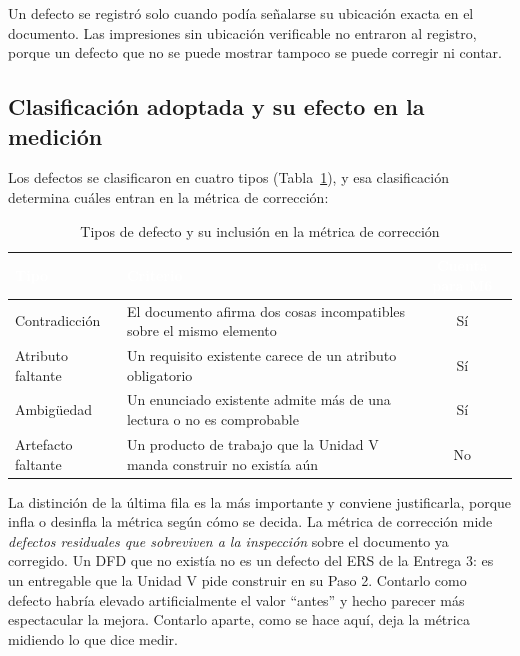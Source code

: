 Un defecto se registr\'o solo cuando pod\'ia se\~nalarse su ubicaci\'on exacta en el documento. Las impresiones sin ubicaci\'on verificable no entraron al registro, porque un defecto que no se puede mostrar tampoco se puede corregir ni contar.

\subsection{Clasificaci\'on adoptada y su efecto en la medici\'on}

Los defectos se clasificaron en cuatro tipos (Tabla~\ref{tab:tipos-defecto}), y esa clasificaci\'on determina cu\'ales entran en la m\'etrica de correcci\'on:

\begin{table}[H]
\centering
\small
\begin{tabular}{|l|p{7.6cm}|c|}
\hline
\cellcolor{sigagreen}\textcolor{white}{\textbf{Tipo}} & \cellcolor{sigagreen}\textcolor{white}{\textbf{Criterio}} & \cellcolor{sigagreen}\textcolor{white}{\textbf{Cuenta para M6}} \\ \hline
Contradicci\'on & El documento afirma dos cosas incompatibles sobre el mismo elemento & S\'i \\ \hline
Atributo faltante & Un requisito existente carece de un atributo obligatorio & S\'i \\ \hline
Ambig\"uedad & Un enunciado existente admite m\'as de una lectura o no es comprobable & S\'i \\ \hline
Artefacto faltante & Un producto de trabajo que la Unidad V manda construir no exist\'ia a\'un & No \\ \hline
\end{tabular}
\caption{Tipos de defecto y su inclusi\'on en la m\'etrica de correcci\'on}
\label{tab:tipos-defecto}
\end{table}

La distinci\'on de la \'ultima fila es la m\'as importante y conviene justificarla, porque infla o desinfla la m\'etrica seg\'un c\'omo se decida. La m\'etrica de correcci\'on mide \emph{defectos residuales que sobreviven a la inspecci\'on} sobre el documento ya corregido. Un DFD que no exist\'ia no es un defecto del ERS de la Entrega 3: es un entregable que la Unidad V pide construir en su Paso 2. Contarlo como defecto habr\'ia elevado artificialmente el valor ``antes'' y hecho parecer m\'as espectacular la mejora. Contarlo aparte, como se hace aqu\'i, deja la m\'etrica midiendo lo que dice medir.

